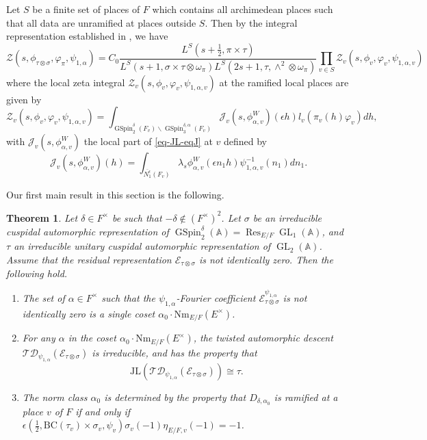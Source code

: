 \documentclass[12pt]{amsart}
\newcommand{\A}{\mathbb{A}}
\newcommand{\Res}{\operatorname{Res}}
\newcommand{\JL}{\mathrm{JL}}
\newcommand{\BC}{\mathrm{BC}}
\newcommand{\TD}{\mathcal{TD}}
\newcommand{\CE}{{\mathcal{E}}}
\newtheorem{theorem}{Theorem}[section]
\theoremstyle{remark}
\DeclareMathOperator{\GL}{GL}
\DeclareMathOperator{\GSpin}{GSpin}
\begin{document}
Let $S$ be a finite set of places of $F$ which contains all archimedean places such that all data are unramified at places outside $S$. Then by the integral representation established in \cite{Yan2025GGP}, we have
\begin{equation}
\label{eq-JL-eq4}
\mathcal{Z}(s, \phi_{\tau\otimes\sigma}, \varphi_\pi, \psi_{1,\alpha})= C_0 \frac{L^S(s+\frac{1}{2}, \pi\times\tau)}{L^S(s+1, \sigma\times\tau\otimes\omega_{\pi}) L^S(2s+1, \tau, \wedge^2\otimes\omega_\pi) } \prod_{v\in S}\mathcal{Z}_v (s, \phi_v,\varphi_v,\psi_{1,\alpha,v})
\end{equation}
where the local zeta integral $\mathcal{Z}_v (s, \phi_v,\varphi_v,\psi_{1,\alpha,v})$ at the ramified local places are given by
\begin{equation*}
\mathcal{Z}_v (s, \phi_v,\varphi_v,\psi_{1,\alpha,v})= \int_{\GSpin_2^{\delta}(F_v)\backslash \GSpin_3^{\delta, \alpha}(F_v)}	\mathcal{J}_v(s, \phi_{\alpha,v}^{W})(\epsilon  h)l_v(\pi_v(h)\varphi_v)dh, 
\end{equation*}
with $\mathcal{J}_v(s, \phi_{\alpha,v}^{W})$ the local part of \eqref{eq-JL-eqJ} at $v$ defined by
\begin{equation*}
\mathcal{J}_v(s, \phi_{\alpha,v}^{W})(h) =\int_{\overline{N_1^{\epsilon}}(F_v)}	\lambda_{s}\phi_{\alpha,v}^{W}(\epsilon n_1 h)\psi^{-1}_{1,\alpha,v}(n_1) d n_1.
\end{equation*}

Our first main result in this section is the following.

\begin{theorem}
\label{thm-JL}
Let $\delta\in F^\times$ be such that $-\delta\not\in (F^\times)^2$. Let $\sigma$ be an irreducible cuspidal automorphic representation of $\GSpin_2^{\delta}(\A)=\Res_{E/F} \GL_1(\A)$, and $\tau$ an irreducible unitary cuspidal automorphic representation of $\GL_{2}(\A)$. 
Assume that the residual representation $\CE_{\tau\otimes\sigma}$ is not identically zero. Then the following hold. 
\begin{enumerate}
\item  The set of $\alpha\in F^\times$ such that the $\psi_{1,\alpha}$-Fourier coefficient $\CE^{\psi_{1,\alpha}}_{\tau\otimes\sigma}$ is not identically zero is a single coset $\alpha_0\cdot \mathrm{Nm}_{E/F} (E^\times)$.
\item For any $\alpha$ in the coset $\alpha_0\cdot \mathrm{Nm}_{E/F} (E^\times)$, the twisted automorphic descent $\TD_{\psi_{1,\alpha}} (\CE_{\tau\otimes\sigma})$ is irreducible, and has the property that 
\begin{equation*}
\JL(\TD_{\psi_{1,\alpha}} (\CE_{\tau\otimes\sigma}) ) \cong \tau. 
\end{equation*}

\item The norm class $\alpha_0$ is determined by the property that  $D_{\delta, \alpha_0}$ is ramified at a place $v$ of $F$ if and only if $\epsilon(\frac{1}{2}, \BC( \tau_v)\times \sigma_v, \psi_v) \sigma_v(-1) \eta_{E/F,v}(-1)=-1$.
\end{enumerate}
\end{theorem}
\end{document}
